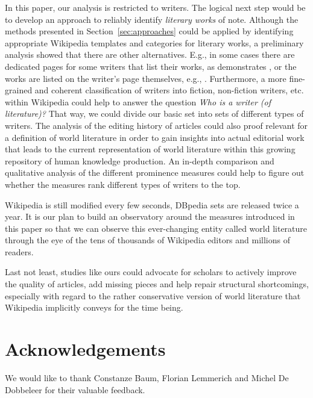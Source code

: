 \documentclass[a4paper,12pt]{scrartcl}
\begin{document}
In this paper, our analysis is restricted to writers. The logical next
step would be to develop an approach to reliably identify
\emph{literary works} of note. Although the methods presented in
Section~\ref{sec:approaches} could be applied by identifying
appropriate Wikipedia templates and categories for literary works, a
preliminary analysis showed that there are other alternatives. E.g.,
in some cases there are dedicated pages for some writers that list
their works, as demonstrates \cite{wp:shakespearbibliography}, %
or the works are listed on the writer's page themselves, e.g., \cite{wp:irving}. %
%
Furthermore, a more fine-grained and coherent classification of
writers into fiction, non-fiction writers, etc. within Wikipedia could
help to answer the question \emph{Who is a writer (of literature)?}
That way, we could divide our basic set into sets of different types
of writers.
%
The analysis of the editing history of articles could also proof relevant
for a definition of world literature in order to gain insights into
actual editorial work that leads to the current representation of world
literature within this growing repository of human knowledge production.
%
An in-depth comparison and qualitative analysis of the different
prominence measures could help to figure out whether the measures rank
different types of writers to the top.


Wikipedia is still modified every few seconds, DBpedia sets are
released twice a year. It is our plan to build an observatory
around the measures introduced in this paper so that we can observe this
ever-changing entity called world literature through the eye of
the tens of thousands of Wikipedia editors and millions of readers.

Last not least, studies like ours could advocate for scholars to
actively improve the quality of articles, add missing pieces and
help repair structural shortcomings, especially with regard to the rather
conservative version of world literature that Wikipedia implicitly
conveys for the time being.

\section*{Acknowledgements}


We would like to thank Constanze Baum, Florian Lemmerich and Michel De
Dobbeleer for their valuable feedback.





% 
% 
\end{document}

